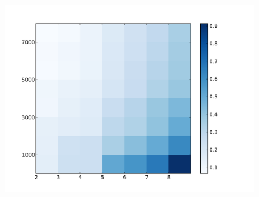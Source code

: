 \documentclass[11pt]{beamer}
\begin{document}
\begin{frame}[allowframebreaks]
\framebreak

\begin{figure}[h]
 \centering
 \includegraphics[width=1.0\textwidth]{./elimination-by-omega.pdf}
\end{figure}


\end{frame}
\end{document}
